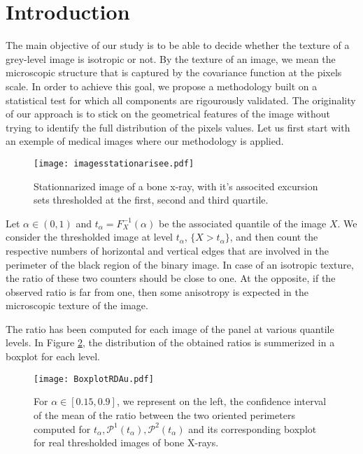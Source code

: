 \documentclass[12pt]{article}
\theoremstyle{Theorem}
\theoremstyle{definition}
\begin{document}
\section{Introduction}

The main objective of our study is to be able to decide whether the texture of a grey-level image is isotropic or not. By the texture of an image, we mean the microscopic structure that is captured by the covariance function at the pixels scale. In order to achieve this goal, we propose a methodology built on a statistical test for which all components are rigourously validated. The originality of our approach is to stick on the geometrical features of the image without trying to identify the full distribution of the pixels values. Let us first start with an exemple of medical images where our methodology is applied. 



\begin{figure}[H]
\centering
{\texttt{[image: imagesstationarisee.pdf]}}
 \caption{Stationnarized image of a bone x-ray, with it's associted excursion sets thresholded at the first, second and third quartile.}
\label{fig22}
\end{figure}

Let $\alpha \in (0,1)$ and $t_{\alpha} = F^{-1}_{X}(\alpha)$ be the associated quantile of the image $X$. We consider the thresholded image at level $t_{\alpha}$, $\{X > t_{\alpha}\}$, and then 
count the respective numbers of horizontal and vertical edges that are involved in the perimeter of the black region of the binary image. In case of an isotropic texture, the ratio of these two counters should be close to one. At the opposite, if the observed ratio is far from one, then some anisotropy is expected in the microscopic texture of the image. 

The ratio has been computed for each image of the panel at various quantile levels. In Figure \ref{fig2}, the distribution of the obtained ratios is summerized in a boxplot for each level.

\begin{figure}[H]
  \centering  
   {\texttt{[image: BoxplotRDAu.pdf]}}
    \hspace{0.2cm}
 \caption{For $\alpha \in [0.15, 0.9]$, we represent on the left, the confidence interval of the mean of the ratio between the two oriented perimeters computed for $t_{\alpha}, \mathcal{P}^{1}(t_{\alpha}), \mathcal{P}^{2}(t_{\alpha})$ and its corresponding boxplot for real thresholded images of bone X-rays.}
\label{fig2}
\end{figure}
\end{document}
